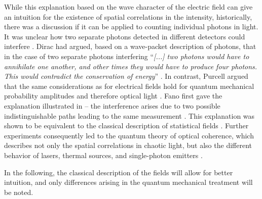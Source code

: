While this explanation based on the wave character of the electric field can give an intuition for the existence of spatial correlations in the intensity, historically, there was a discussion if it can be applied to counting individual photons in light. It was unclear how two separate photons detected in different detectors could interfere \cite{brannen1956}. Dirac had argued, based on a wave-packet description of photons, that in the case of two separate photons interfering \enquote{\textit{[...] two photons would have to annihilate one another, and other times they would have to produce four photons. This would contradict the conservation of energy}} \cite{dirac1958}. In contrast, Purcell argued that the same considerations as for electrical fields hold for quantum mechanical probability amplitudes and therefore optical light \cite{purcell}. Fano first gave the explanation illustrated in  -- the interference arises due to two possible indistinguishable paths leading to the same measurement \cite{fano1961,agarwal2013}. This explanation was shown to be equivalent to the classical description of statistical fields \cite{sudarshan1963}. Further experiments consequently led to the quantum theory of optical coherence, which describes not only the spatial correlations in chaotic light, but also the different behavior of lasers, thermal sources, and single-photon emitters  \cite{glauber2006}.

In the following, the classical description of the fields will allow for better intuition, and only differences arising in the quantum mechanical treatment will be noted. 


